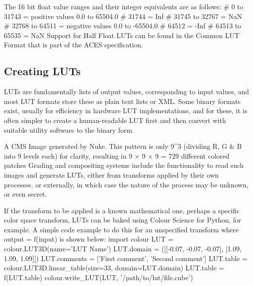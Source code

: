 The 16 bit float value ranges and their integer equivalents are as follows:
        # 0 to 31743 = positive values 0.0 to 65504.0
        # 31744 = Inf
        # 31745 to 32767 = NaN
        # 32768 to 64511 = negative values 0.0 to -65504.0
        # 64512 = -Inf
        # 64513 to 65535 = NaN
Support for Half Float LUTs can be found in the Common LUT Format that is part of the ACES specification.

\subsection{Creating LUTs}

LUTs are fundamentally lists of output values, corresponding to input values, and most LUT formats store these as plain text lists or XML. Some binary formats exist, usually for efficiency in hardware LUT implementations, and for these, it is often simpler to create a human-readable LUT first and then convert with suitable utility software to the binary form.

A CMS Image generated by Nuke. This pattern is only 9^3 (dividing R, G & B into 9 levels each)
for clarity, resulting in 9 × 9 × 9 = 729 different colored patches
Grading and compositing systems include the functionality to read such images and generate LUTs, either from transforms applied by their own processes, or externally, in which case the nature of the process may be unknown, or even secret.

If the transform to be applied is a known mathematical one, perhaps a specific color space transform, LUTs can be baked using Colour Science for Python, for example. A simple code example to do this for an unspecified transform where output = f(input) is shown below:
import colour
LUT = colour.LUT3D(name='LUT Name')
LUT.domain = ([[-0.07, -0.07, -0.07], [1.09, 1.09, 1.09]])
LUT.comments = ['First comment', 'Second comment']
LUT.table = colour.LUT3D.linear_table(size=33, domain=LUT.domain)
LUT.table = f(LUT.table)
colour.write_LUT(LUT, '/path/to/lut/file.cube')

